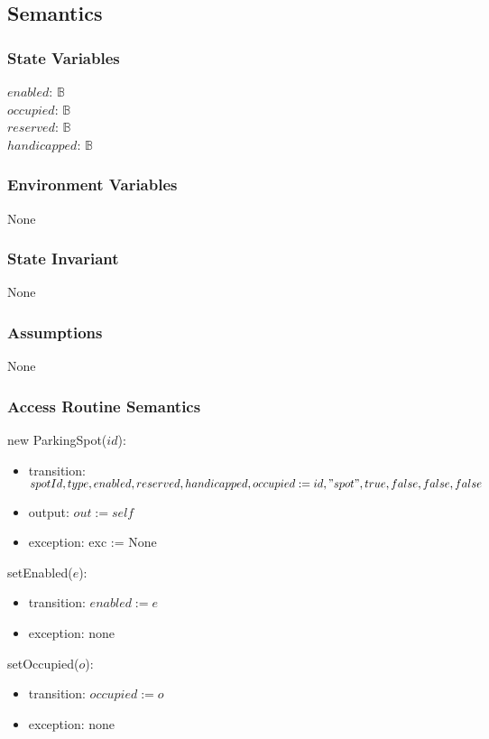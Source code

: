 \documentclass[12pt, titlepage]{article}
\begin{document}
\subsection{Semantics}

\subsubsection{State Variables}
$enabled$: $\mathbb{B}$\\
$occupied$: $\mathbb{B}$\\
$reserved$: $\mathbb{B}$\\
$handicapped$: $\mathbb{B}$\\

\subsubsection{Environment Variables}
None

\subsubsection{State Invariant}
None

\subsubsection{Assumptions}
None

\subsubsection{Access Routine Semantics}

\noindent new ParkingSpot($id$):
\begin{itemize}
\item transition: $spotId, type, enabled, reserved, handicapped, occupied :=
id, "spot", \\
true, false, false, false$
\item output: $out := self$
\item exception: exc := None
\end{itemize}

\noindent setEnabled($e$):
\begin{itemize} 
\item transition: $enabled := e$
\item exception: none
\end{itemize}

\noindent setOccupied($o$):
\begin{itemize} 
\item transition: $occupied := o$
\item exception: none
\end{itemize}
\end{document}
